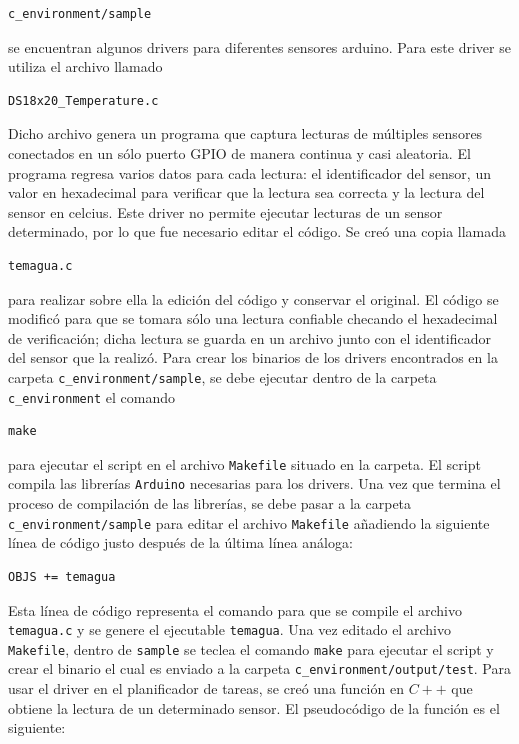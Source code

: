 \documentclass[10pt,twocolumn]{article}
\begin{document}
\begin{verbatim}
c_environment/sample
\end{verbatim}

se encuentran algunos drivers para 
diferentes sensores arduino. Para este driver se utiliza el 
archivo llamado

\begin{verbatim}
DS18x20_Temperature.c
\end{verbatim}

Dicho archivo genera un programa que captura lecturas de m\'ultiples sensores conectados en 
un s\'olo puerto GPIO de manera continua y casi aleatoria. El 
programa regresa varios datos para cada lectura: el identificador del 
sensor, un valor en hexadecimal para verificar que la lectura sea 
correcta y la lectura del sensor en celcius. Este driver no permite ejecutar lecturas de un sensor determinado, por lo que fue 
necesario editar el c\'odigo. Se cre\'o una copia llamada

\begin{verbatim}
temagua.c
\end{verbatim}

para realizar sobre ella la edici\'on del c\'odigo y conservar el original. El c\'odigo se modific\'o para que se tomara s\'olo una lectura 
confiable checando el hexadecimal de verificaci\'on; dicha lectura se guarda en un archivo 
junto con el identificador del sensor que la realiz\'o. Para 
crear los binarios de los drivers encontrados en la carpeta \verb|c_environment/sample|, se debe 
ejecutar dentro de la carpeta \verb|c_environment| el comando

\begin{verbatim}
make
\end{verbatim}

para ejecutar el script en el archivo \verb|Makefile| situado en la carpeta. El script compila las 
librer\'ias \verb|Arduino| necesarias para los drivers. Una vez que termina el 
proceso de compilaci\'on de las librer\'ias, se debe pasar a la carpeta \verb|c_environment/sample| para editar el archivo \verb|Makefile| a\~nadiendo la siguiente l\'inea 
de c\'odigo justo despu\'es de la \'ultima l\'inea an\'aloga:

\begin{verbatim}
OBJS += temagua
\end{verbatim}

Esta l\'inea de c\'odigo representa el comando para que se compile el archivo \verb|temagua.c| y se genere el ejecutable \verb|temagua|. Una vez editado el archivo 
\verb|Makefile|, dentro de \verb|sample| se teclea el comando \verb|make| para ejecutar el script y crear el binario el cual es enviado a la carpeta 
\verb|c_environment/output/test|. Para usar el driver 
en el planificador de tareas, se cre\'o una funci\'on en $C++$ que obtiene la lectura de un determinado sensor. El pseudoc\'odigo de la 
funci\'on es el siguiente:
\end{document}
